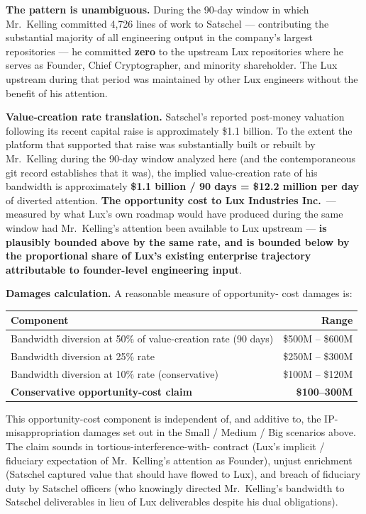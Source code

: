 \documentclass[11pt,letterpaper]{article}
\begin{document}
\textbf{The pattern is unambiguous.} During the 90-day window in
which Mr.\ Kelling committed 4,726 lines of work to Satschel ---
contributing the substantial majority of all engineering output in
the company's largest repositories --- he committed \textbf{zero}
to the upstream Lux repositories where he serves as Founder, Chief
Cryptographer, and minority shareholder. The Lux upstream during
that period was maintained by other Lux engineers without the
benefit of his attention.

\textbf{Value-creation rate translation.} Satschel's reported
post-money valuation following its recent capital raise is
approximately \$1.1 billion. To the extent the platform that
supported that raise was substantially built or rebuilt by Mr.\
Kelling during the 90-day window analyzed here (and the
contemporaneous git record establishes that it was), the implied
value-creation rate of his bandwidth is approximately
\textbf{\$1.1 billion / 90 days = \$12.2 million per day} of
diverted attention. \textbf{The opportunity cost to Lux Industries
Inc.}\ ---measured by what Lux's own roadmap would have produced
during the same window had Mr.\ Kelling's attention been available
to Lux upstream --- \textbf{is plausibly bounded above by the same
rate, and is bounded below by the proportional share of Lux's
existing enterprise trajectory attributable to founder-level
engineering input}.

\textbf{Damages calculation.} A reasonable measure of opportunity-
cost damages is:

\begin{center}
\begin{tabular}{lr}
\toprule
\textbf{Component} & \textbf{Range} \\
\midrule
Bandwidth diversion at 50\% of value-creation rate (90 days) & \$500M -- \$600M \\
Bandwidth diversion at 25\% rate & \$250M -- \$300M \\
Bandwidth diversion at 10\% rate (conservative) & \$100M -- \$120M \\
\midrule
\textbf{Conservative opportunity-cost claim} & \textbf{\$100--300M} \\
\bottomrule
\end{tabular}
\end{center}

This opportunity-cost component is independent of, and additive to,
the IP-misappropriation damages set out in the Small / Medium / Big
scenarios above. The claim sounds in tortious-interference-with-
contract (Lux's implicit / fiduciary expectation of Mr.\ Kelling's
attention as Founder), unjust enrichment (Satschel captured value
that should have flowed to Lux), and breach of fiduciary duty by
Satschel officers (who knowingly directed Mr.\ Kelling's bandwidth
to Satschel deliverables in lieu of Lux deliverables despite his
dual obligations).
\end{document}
